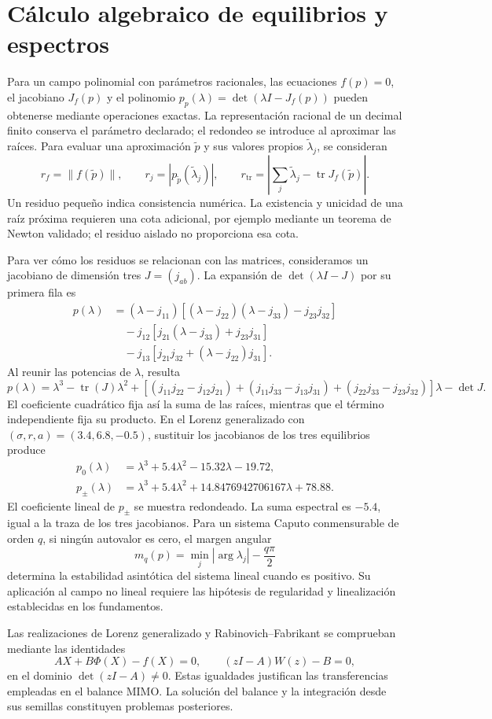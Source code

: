 \section{Cálculo algebraico de equilibrios y espectros}
\label{app:algebra-espectros}

Para un campo polinomial con parámetros racionales, las ecuaciones
\(f(p)=0\), el jacobiano \(J_f(p)\) y el polinomio
\(p_p(\lambda)=\det(\lambda I-J_f(p))\) pueden obtenerse mediante
operaciones exactas. La representación racional de un decimal finito conserva
el parámetro declarado; el redondeo se introduce al aproximar las raíces.
Para evaluar una aproximación \(\widetilde p\) y sus valores propios
\(\widetilde\lambda_j\), se consideran
\[
 r_f=\|f(\widetilde p)\|,\qquad
 r_j=|p_{\widetilde p}(\widetilde\lambda_j)|,\qquad
 r_{\mathrm{tr}}=
 \left|\sum_j\widetilde\lambda_j-\operatorname{tr}J_f(\widetilde p)\right|.
\]
Un residuo pequeño indica consistencia numérica. La existencia y unicidad de
una raíz próxima requieren una cota adicional, por ejemplo mediante un
teorema de Newton validado; el residuo aislado no proporciona esa cota.

Para ver cómo los residuos se relacionan con las matrices, consideramos
un jacobiano de dimensión tres \(J=(j_{ab})\). La expansión de
\(\det(\lambda I-J)\) por su primera fila es
\begin{align*}
 p(\lambda)
 &=(\lambda-j_{11})[(\lambda-j_{22})(\lambda-j_{33})-j_{23}j_{32}]\\
 &\quad-j_{12}[j_{21}(\lambda-j_{33})+j_{23}j_{31}]\\
 &\quad-j_{13}[j_{21}j_{32}+(\lambda-j_{22})j_{31}].
\end{align*}
Al reunir las potencias de \(\lambda\), resulta
\[
 p(\lambda)=\lambda^3-\operatorname{tr}(J)\lambda^2
 +\left[(j_{11}j_{22}-j_{12}j_{21})
       +(j_{11}j_{33}-j_{13}j_{31})
       +(j_{22}j_{33}-j_{23}j_{32})\right]\lambda-\det J.
\]
El coeficiente cuadrático fija así la suma de las raíces, mientras que
el término independiente fija su producto. En el Lorenz generalizado con
\((\sigma,r,a)=(3.4,6.8,-0.5)\), sustituir los jacobianos de los tres
equilibrios produce
\begin{align*}
 p_0(\lambda)&=\lambda^3+5.4\lambda^2-15.32\lambda-19.72,\\
 p_{\pm}(\lambda)&=\lambda^3+5.4\lambda^2
 +14.8476942706167\lambda+78.88.
\end{align*}
El coeficiente lineal de \(p_\pm\) se muestra redondeado. La suma espectral
es \(-5.4\), igual a la traza de los tres jacobianos. Para un sistema Caputo
conmensurable de orden \(q\), si ningún autovalor es cero, el margen angular
\[
 m_q(p)=\min_j|\arg\lambda_j|-\frac{q\pi}{2}
\]
determina la estabilidad asintótica del sistema lineal cuando es positivo.
Su aplicación al campo no lineal requiere las hipótesis de regularidad y
linealización establecidas en los fundamentos.

Las realizaciones de Lorenz generalizado y Rabinovich--Fabrikant se comprueban
mediante las identidades
\[
 AX+B\Phi(X)-f(X)=0,\qquad
 (zI-A)W(z)-B=0,
\]
en el dominio \(\det(zI-A)\ne0\). Estas igualdades justifican las
transferencias empleadas en el balance MIMO. La solución del balance y la
integración desde sus semillas constituyen problemas posteriores.
